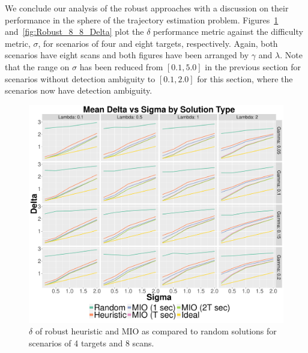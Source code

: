 We conclude our analysis of the robust approaches with a discussion on their performance in the sphere of the trajectory estimation problem. Figures~\ref{fig:Robust_4_8_Delta} and~\ref{fig:Robust_8_8_Delta} plot the $\delta$ performance metric against the difficulty metric, $\sigma$, for scenarios of four and eight targets, respectively. Again, both scenarios have eight scans and both figures have been arranged by $\gamma$ and $\lambda$. Note that the range on $\sigma$ has been reduced from $[0.1,5.0]$ in the previous section for scenarios without detection ambiguity to $[0.1, 2.0]$ for this section, where the scenarios now have detection ambiguity. 
\begin{figure}[ht]
  \centering
  \includegraphics[width=\columnwidth]{../Figures/4_8_Delta}
  \caption{$\delta$ of robust heuristic and MIO as compared to random solutions for scenarios of 4 targets and 8 scans.}
  \label{fig:Robust_4_8_Delta}
\end{figure}
